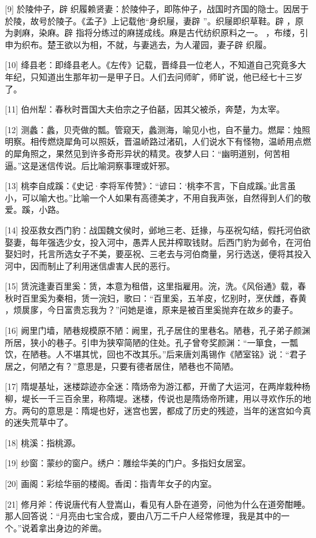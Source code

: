 \documentclass[12pt,UTF8]{ctexbook}
\begin{document}
[9] 於陵仲子，辟 织履赖贤妻：於陵仲子，即陈仲子，战国时齐国的隐士。因居于於陵，故号於陵子。《孟子》上记载他“身织屦，妻辟 ”。织屦即织草鞋。辟 ，原为剥麻，染麻。辟 指将分练过的麻搓成线。麻是古代纺织原料之一。 ，布缕，引申为织布。楚王欲以为相，不就，与妻逃去，为人灌园，妻子辟 织履。

[10] 绛县老：即绛县老人。《左传》记载，晋绛县一位老人，不知道自己究竟多大年纪，只知道出生那年初一是甲子日。人们去问师旷，师旷说，他已经七十三岁了。

[11] 伯州犁：春秋时晋国大夫伯宗之子伯嚭，因其父被杀，奔楚，为太宰。

[12] 测蠡：蠡，贝壳做的瓢。管窥天，蠡测海，喻见小也，自不量力。燃犀：烛照明察。相传燃烧犀角可以照妖，晋温峤路过渚矶，人们说水下有怪物，温峤用点燃的犀角照之，果然见到许多奇形异状的精灵。夜梦人曰：“幽明道别，何苦相逼。”这是迷信传说。后比喻洞察事理或奸邪。

[13] 桃李自成蹊：《史记·李将军传赞》：“谚曰：‘桃李不言，下自成蹊。’此言虽小，可以喻大也。”比喻一个人如果有高德美才，不用自我声张，自然得到人们的敬爱。蹊，小路。

[14] 投巫救女西门豹：战国魏文侯时，邺地三老、廷掾，与巫祝勾结，假托河伯欲娶妻，每年强选少女，投入河中，愚弄人民并榨取钱财。后西门豹为邺令，在河伯娶妇时，托言所选女子不美，要巫祝、三老去与河伯商量，另行选送，便将其投入河中，因而制止了利用迷信虐害人民的恶行。

[15] 赁浣逢妻百里奚：赁，本意为租借，这里指雇用。浣，洗。《风俗通》载，春秋时百里奚为秦相，赁一浣妇，歌曰：“百里奚，五羊皮，忆别时，烹伏雌，舂黄 ，烦扊扅，今日富贵忘我为？”问她是谁，原来是被百里奚抛弃在故乡的妻子。

[16] 阙里门墙，陋巷规模原不陋：阙里，孔子居住的里巷名。陋巷，孔子弟子颜渊所居，狭小的巷子。引申为狭窄简陋的住处。孔子曾夸奖颜渊：“一箪食，一瓢饮，在陋巷。人不堪其忧，回也不改其乐。”后来唐刘禹锡作《陋室铭》说：“君子居之，何陋之有？”意思是，只要有德者居住，陋巷也不简陋。

[17] 隋堤基址，迷楼踪迹亦全迷：隋炀帝为游江都，开凿了大运河，在两岸栽种杨柳，堤长一千三百余里，称隋堤。迷楼，传说也是隋炀帝所建，用以寻欢作乐的地方。两句的意思是：隋堤也好，迷宫也罢，都成了历史的残迹，当年的迷宫如今真的迷失荒草中了。

[18] 桃溪：指桃源。

[19] 纱窗：蒙纱的窗户。绣户：雕绘华美的门户。多指妇女居室。

[20] 画阁：彩绘华丽的楼阁。香闺：指青年女子的内室。

[21] 修月斧：传说唐代有人登嵩山，看见有人卧在道旁，问他为什么在道旁酣睡。那人回答说：“月亮由七宝合成，要由八万二千户人经常修理，我是其中的一个。”说着拿出身边的斧凿。
\end{document}
